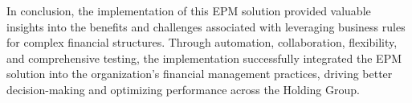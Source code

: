 \documentclass[12pt,a4paper,openright,twoside]{book}
\begin{document}
In conclusion, the implementation of this EPM solution provided valuable insights into the benefits and challenges associated with leveraging business rules for complex financial structures. 
%
Through automation, collaboration, flexibility, and comprehensive testing, the implementation successfully integrated the EPM solution into the organization's financial management practices, driving better decision-making and optimizing performance across the Holding Group.


\nocite{*} %


\end{document}

